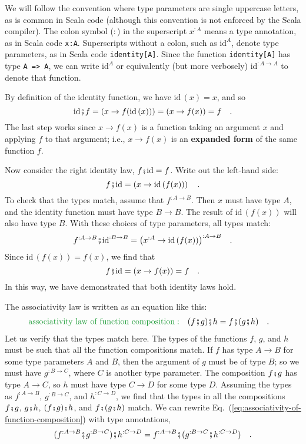 We will follow the convention where type parameters are single uppercase
letters, as is common in Scala code (although this convention is not
enforced by the Scala compiler). The colon symbol ($:$) in the superscript
$x^{:A}$ means a type annotation, as in Scala code \lstinline!x:A!.
Superscripts without a colon, such as $\text{id}^{A}$, denote type
parameters, as in Scala code \lstinline!identity[A]!. Since the function
\lstinline!identity[A]! has type \lstinline!A => A!, we can write
$\text{id}^{A}$ or equivalently (but more verbosely) $\text{id}^{:A\rightarrow A}$
to denote that function.

By definition of the identity function, we have $\text{id}\,(x)=x$,
and so 
\[
\text{id}\bef f=\left(x\rightarrow f(\text{id}\,(x))\right)=\left(x\rightarrow f(x)\right)=f\quad.
\]
The last step works since $x\rightarrow f(x)$ is a function taking
an argument $x$ and applying $f$ to that argument; i.e., $x\rightarrow f(x)$
is an \textbf{expanded form} of
the same function $f$.

Now consider the right identity law, $f\bef\text{id}=f$. Write out
the left-hand side:
\[
f\bef\text{id}=\left(x\rightarrow\text{id}\,(f(x))\right)\quad.
\]
To check that the types match, assume that $f^{:A\rightarrow B}$.
Then $x$ must have type $A$, and the identity function must have
type $B\rightarrow B$. The result of $\text{id}\,(f(x))$ will also
have type $B$. With these choices of type parameters, all types match:
\[
f^{:A\rightarrow B}\bef\text{id}^{:B\rightarrow B}=\big(x^{:A}\rightarrow\text{id}\,(f(x))\big)^{:A\rightarrow B}\quad.
\]
Since $\text{id}\,(f(x))=f(x)$, we find that 
\[
f\bef\text{id}=\left(x\rightarrow f(x)\right)=f\quad.
\]
In this way, we have demonstrated that both identity laws hold. 

The associativity law is written as an equation like this:
\begin{align}
{\color{greenunder}\text{associativity law of function composition}:}\quad & (f\bef g)\bef h=f\bef(g\bef h)\quad.\label{eq:associativity-of-function-composition}
\end{align}
Let us verify that the types match here. The types of the functions
$f$, $g$, and $h$ must be such that all the function compositions
match. If $f$ has type $A\rightarrow B$ for some type parameters
$A$ and $B$, then the argument of $g$ must be of type $B$; so
we must have $g^{:B\rightarrow C}$, where $C$ is another type parameter.
The composition $f\bef g$ has type $A\rightarrow C$, so $h$ must
have type $C\rightarrow D$ for some type $D$. Assuming the types
as $f^{:A\rightarrow B}$, $g^{:B\rightarrow C}$, and $h^{:C\rightarrow D}$,
we find that the types in all the compositions $f\bef g$, $g\bef h$,
$(f\bef g)\bef h$, and $f\bef(g\bef h)$ match. We can rewrite Eq.~(\ref{eq:associativity-of-function-composition})
with type annotations, 
\begin{equation}
(f^{:A\rightarrow B}\bef g^{:B\rightarrow C})\bef h^{:C\rightarrow D}=f^{:A\rightarrow B}\bef(g^{:B\rightarrow C}\bef h^{:C\rightarrow D})\quad.\label{eq:associativity-law-for-function-composition-with-types}
\end{equation}

